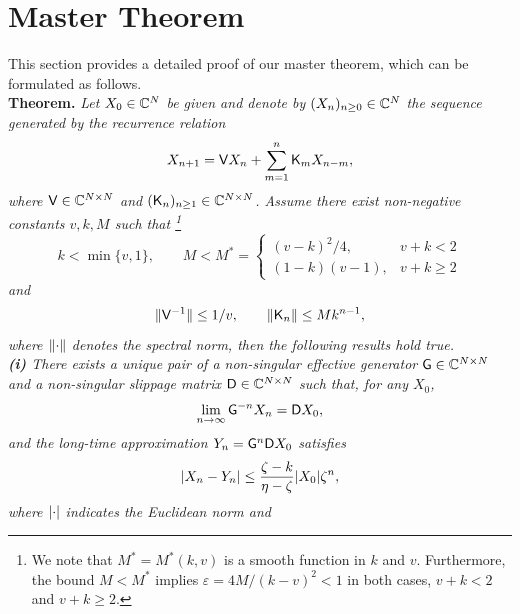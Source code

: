 \documentclass[aps,prl,reprint]{revtex4-2}
\begin{document}
\tableofcontents

\newpage

\section{Master Theorem}

This section provides a detailed proof of our master theorem, which can be formulated as follows.\\

\noindent
\textbf{Theorem.}
\emph{
	Let $X_0\in\mathbb{C}^N$ be given and denote by $(X_n)_{n\geq 0}\in\mathbb{C}^N$ the sequence generated by the recurrence relation
	\begin{equation}\label{eq:mt:NLEEq}
	X_{n+1} = \mathsf{V} X_n + \sum_{m=1}^n \mathsf{K}_m X_{n-m},
	\end{equation}
	where $\mathsf{V}\in\mathbb{C}^{N\times N}$ and $(\mathsf{K}_n)_{n\geq 1}\in\mathbb{C}^{N\times N}$.
	Assume there exist non-negative constants $v,k,M$ such that \footnote{We note that $M^\ast = M^\ast(k,v)$ is a smooth function in $k$ and $v$.
		Furthermore, the bound $M<M^\ast$ implies $\varepsilon= 4M/(k-v)^2 <1$ in both cases, $v+k<2$ and $v+k\geq 2$.}
	\begin{equation}\label{eq:mt:WMC2}
	k < \min\{v,1\}, \qquad
	M < M^\ast = \begin{cases}(v-k)^2/4, & v+k <2 \\ (1-k)(v-1), & v+k \geq 2\end{cases}
	\end{equation}
	and
	\begin{equation}\label{eq:mt:WMC1}
	\lVert \mathsf{V}^{-1} \rVert\leq 1/v, \qquad \lVert \mathsf{K}_n \rVert\leq Mk^{n-1},
	\end{equation}
	where $\lVert \cdot \rVert$ denotes the spectral norm, then the following results hold true.\\
	\textbf{(i)} There exists a unique pair of a non-singular effective generator $\mathsf{G}\in\mathbb{C}^{N\times N}$ and a non-singular slippage matrix $\mathsf{D}\in\mathbb{C}^{N\times N}$ such that, for any $X_0$,
	\begin{equation}\label{eq:mt:SMAsm}
	\lim_{n\rightarrow\infty}\mathsf{G}^{-n}X_n = \mathsf{D} X_0,
	\end{equation}
	and the long-time approximation $Y_n=\mathsf{G}^n\mathsf{D} X_0$ satisfies
	\begin{equation}\label{eq:mt:LTAErr}
	\lvert X_n - Y_n \rvert\leq\frac{\zeta-k}{\eta-\zeta}\lvert X_0 \rvert\zeta^n,
	\end{equation}
	where $\lvert \cdot \rvert$ indicates the Euclidean norm and
	\begin{equation}\label{eq:mt:ZetEta}

\end{equation}}
\end{document}
